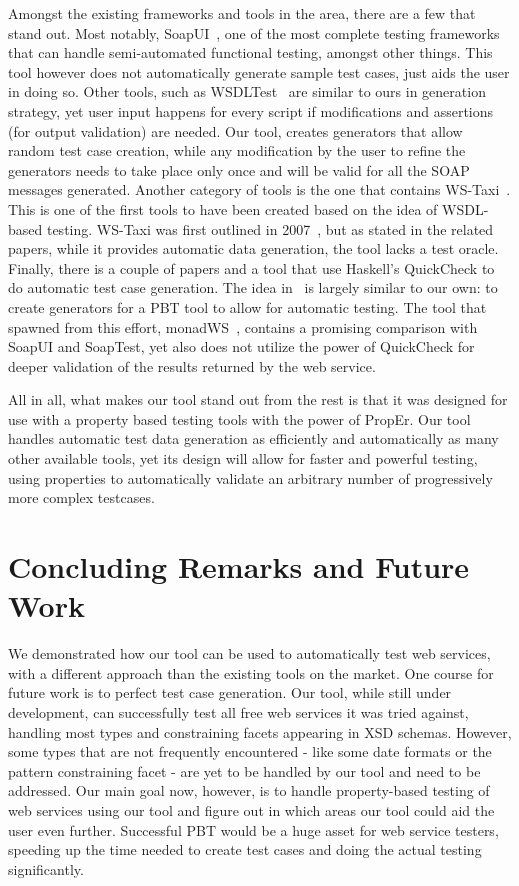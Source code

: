 \documentclass[submission,copyright,a4]{eptcs}
\begin{document}
Amongst the existing frameworks and tools in the area, there are a few that 
stand out. 
Most notably, SoapUI~\cite{soapUI}, one of the most complete testing frameworks
that can handle semi-automated functional testing, amongst other things. This 
tool however does not automatically generate sample test cases, just aids the
user in doing so.
Other tools, such as WSDLTest~\cite{wsdltest@IEEE06} are similar to ours in 
generation strategy, yet user input happens for every script if modifications 
and assertions (for output validation) are needed. Our tool, creates generators 
that allow random test case creation, while any modification by the user to
refine the generators needs to take place only once and will be valid for all
the SOAP messages generated.
Another category of tools is the one that contains WS-Taxi~\cite{taxi@IC-08}. 
This is one of the first tools to have been created based on the idea
of WSDL-based testing. WS-Taxi was first outlined in
2007~\cite{partition@AST-07}, but as stated in the related papers,
while it provides automatic data generation, the tool lacks a test oracle.
%
Finally, there is a couple of papers and a tool that use Haskell's
QuickCheck to do automatic test case generation. The idea
in~\cite{ws_quickcheck} is largely similar to our own: to create
generators for a PBT tool to allow for automatic testing. The tool
that spawned from this effort, monadWS~\cite{monadWS@AST-11}, contains
a promising comparison with SoapUI and SoapTest, yet also does not
utilize the power of QuickCheck for deeper validation of the results
returned by the web service.

All in all, what makes our tool stand out from the rest is that it 
was designed for use with a property based testing tools with the 
power of PropEr. Our tool handles automatic test data generation as
efficiently and automatically as many other available tools, yet its
design will allow for faster and powerful testing, using properties 
to automatically validate an arbitrary number of progressively more 
complex testcases.

\section{Concluding Remarks and Future Work}

We demonstrated how our tool can be used to automatically test web services, with a
different approach than the existing tools on the market. 
One course for future work is to perfect test case generation. Our tool, 
while still under development, can successfully test all free web
services it was tried against, handling most types and constraining
facets appearing in XSD schemas. However, some types that are not
frequently encountered - like some date formats or the pattern
constraining facet - are yet to be handled by our tool and need to be addressed.
Our main goal now, however, is to handle property-based testing of web services 
using our tool and figure out in which areas our tool could aid the user even 
further. Successful PBT would be a huge asset for web service testers, speeding 
up the time needed to create test cases and doing the actual testing 
significantly.



\end{document}

